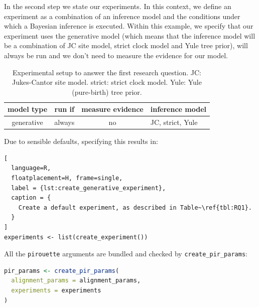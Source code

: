 \documentclass{article}
\begin{document}

In the second step we state our experiments. In this context, we
define an experiment as a combination of an inference model
and the conditions under which a Bayesian inference is executed.
Within this example, we specify that our experiment uses the
generative model (which means that the inference model will be a combination of JC site model, strict clock model and Yule tree prior), will always be run and we don't need to measure the evidence for our model.

\begin{table}
  \begin{tabular}{ | c | c | c | l | }
    \hline
    \textbf{model type} & \textbf{run if} & \textbf{measure evidence} & \textbf{inference model} \\ 
    \hline
    generative & always & no & JC, strict, Yule \\
    \hline
  \end{tabular}
  \caption{
    Experimental setup to answer the first research question.
    JC: Jukes-Cantor site model.
    strict: strict clock model.
    Yule: Yule (pure-birth) tree prior.
  }
  \label{tbl:RQ1}
\end{table}

Due to sensible defaults, specifying this
results in:

\begin{lstlisting}[
  language=R, 
  floatplacement=H, frame=single,
  label = {lst:create_generative_experiment},
  caption = {
    Create a default experiment, as described in Table~\ref{tbl:RQ1}.
  }
]
experiments <- list(create_experiment())
\end{lstlisting}

All the \verb;pirouette; arguments are bundled
and checked by \verb;create_pir_params;:

\begin{lstlisting}[language=R, floatplacement=H, frame=single]
pir_params <- create_pir_params(
  alignment_params = alignment_params,
  experiments = experiments
)
\end{lstlisting}
\end{document}
